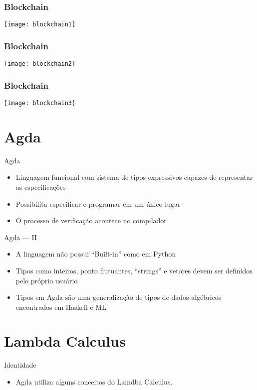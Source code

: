 \documentclass{beamer}
\begin{document}
\begin{frame}
\frametitle{Blockchain}
\texttt{[image: blockchain1]}
\end{frame}

\begin{frame}
\frametitle{Blockchain}
\texttt{[image: blockchain2]}
\end{frame}

\begin{frame}
\frametitle{Blockchain}
\texttt{[image: blockchain3]}
\end{frame}
 
\section{Agda}

 \begin{frame}{Agda}
 \begin{itemize}
   \item Linguagem funcional com sistema de tipos expressivos capazes de representar as especificações
     \item Possibilita especificar e programar em um único lugar
     \item O processo de verificação acontece no compilador
 \end{itemize}
 \end{frame}
 
 \begin{frame}{Agda --- II}
 \begin{itemize}
     \item A linguagem não possui \foreignquote{english}{Built-in} como em Python
     \item Tipos como inteiros, ponto flutuantes, \foreignquote{english}{strings} e vetores devem ser definidos pelo próprio usuário
     \item Tipos em Agda são uma generalização de tipos de dados algébricos encontrados em Haskell e ML
 \end{itemize}
 \end{frame}

\section{Lambda Calculus}

 \begin{frame}{Identidade}
  \begin{itemize}
    \item Agda utiliza alguns conceitos do Lamdba Calculus.
  \end{itemize}
 \end{frame}
 
\end{document}
